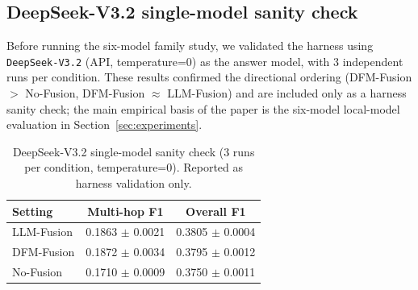 \subsection{DeepSeek-V3.2 single-model sanity check}

Before running the six-model family study, we validated the harness using \texttt{DeepSeek-V3.2} (API, temperature=0) as the answer model, with 3 independent runs per condition. These results confirmed the directional ordering (DFM-Fusion $>$ No-Fusion, DFM-Fusion $\approx$ LLM-Fusion) and are included only as a harness sanity check; the main empirical basis of the paper is the six-model local-model evaluation in Section~\ref{sec:experiments}.

\begin{table}[h]
\centering
\caption{DeepSeek-V3.2 single-model sanity check (3 runs per condition, temperature=0). Reported as harness validation only.}
\label{tab:appendix_pilot}
\begin{tabular}{lcc}
\toprule
Setting & Multi-hop F1 & Overall F1 \\
\midrule
LLM-Fusion & 0.1863 $\pm$ 0.0021 & 0.3805 $\pm$ 0.0004 \\
DFM-Fusion & 0.1872 $\pm$ 0.0034 & 0.3795 $\pm$ 0.0012 \\
No-Fusion & 0.1710 $\pm$ 0.0009 & 0.3750 $\pm$ 0.0011 \\
\bottomrule
\end{tabular}
\end{table}

